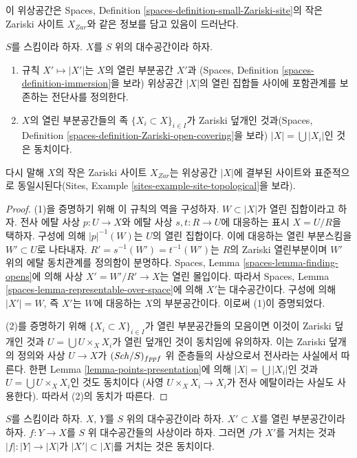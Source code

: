 \noindent
이 위상공간은 Spaces, Definition
\ref{spaces-definition-small-Zariski-site}의 작은 Zariski 사이트
$X_{Zar}$와 같은 정보를 담고 있음이 드러난다.

\begin{lemma}
\label{lemma-open-subspaces}
$S$를 스킴이라 하자.
$X$를 $S$ 위의 대수공간이라 하자.
\begin{enumerate}
\item 규칙 $X' \mapsto |X'|$는 $X$의 열린 부분공간 $X'$과
(Spaces, Definition \ref{spaces-definition-immersion}을 보라)
위상공간 $|X|$의 열린 집합들 사이에 포함관계를 보존하는
전단사를 정의한다.
\item $X$의 열린 부분공간들의 족
$\{X_i \subset X\}_{i \in I}$가 Zariski 덮개인 것과(Spaces,
Definition \ref{spaces-definition-Zariski-open-covering}을 보라)
$|X| = \bigcup |X_i|$인 것은 동치이다.
\end{enumerate}
다시 말해 $X$의 작은 Zariski 사이트 $X_{Zar}$는 위상공간
$|X|$에 결부된 사이트와 표준적으로 동일시된다(Sites, Example
\ref{sites-example-site-topological}을 보라).
\end{lemma}

\begin{proof}
(1)을 증명하기 위해 이 규칙의 역을 구성하자.
$W \subset |X|$가 열린 집합이라고 하자.
전사 에탈 사상 $p : U \to X$와 에탈 사상
$s, t : R \to U$에 대응하는 표시 $X = U/R$을 택하자.
구성에 의해 $|p|^{-1}(W)$는 $U$의 열린 집합이다.
이에 대응하는 열린 부분스킴을 $W' \subset U$로 나타내자.
$R' = s^{-1}(W') = t^{-1}(W')$는 $R$의 Zariski 열린부분이며
$W'$ 위의 에탈 동치관계를 정의함이 분명하다.
Spaces, Lemma \ref{spaces-lemma-finding-opens}에 의해 사상
$X' = W'/R' \to X$는 열린 몰입이다. 따라서 Spaces, Lemma
\ref{spaces-lemma-representable-over-space}에 의해 $X'$는
대수공간이다. 구성에 의해 $|X'| = W$, 즉 $X'$는 $W$에
대응하는 $X$의 부분공간이다. 이로써 (1)이 증명되었다.

\medskip\noindent
(2)를 증명하기 위해 $\{X_i \subset X\}_{i \in I}$가 열린
부분공간들의 모음이면 이것이 Zariski 덮개인 것과
$U = \bigcup U \times_X X_i$가 열린 덮개인 것이 동치임에
유의하자. 이는 Zariski 덮개의 정의와 사상 $U \to X$가
$(\mathit{Sch}/S)_{fppf}$ 위 준층들의 사상으로서 전사라는 사실에서 따른다.
한편 Lemma \ref{lemma-points-presentation}에 의해
$|X| = \bigcup |X_i|$인 것과
$U = \bigcup U \times_X X_i$인 것도 동치이다
(사영 $U \times_X X_i \to X_i$가 전사 에탈이라는 사실도 사용한다).
따라서 (2)의 동치가 따른다.
\end{proof}

\begin{lemma}
\label{lemma-factor-through-open-subspace}
$S$를 스킴이라 하자.
$X$, $Y$를 $S$ 위의 대수공간이라 하자.
$X' \subset X$를 열린 부분공간이라 하자.
$f : Y \to X$를 $S$ 위 대수공간들의 사상이라 하자.
그러면 $f$가 $X'$를 거치는 것과
$|f| : |Y| \to |X|$가 $|X'| \subset |X|$를 거치는 것은 동치이다.
\end{lemma}

